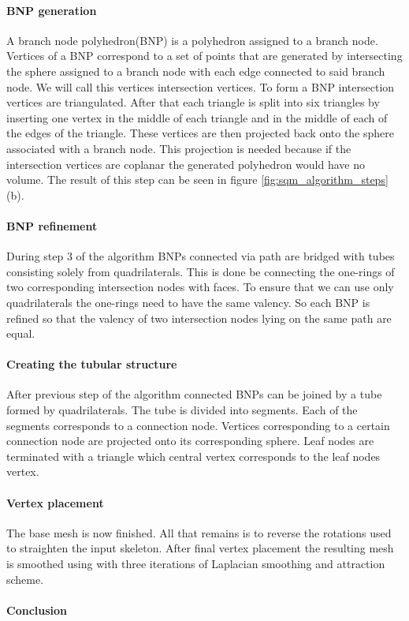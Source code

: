 \paragraph{BNP generation}
A branch node polyhedron(BNP) is a polyhedron assigned to a branch node. Vertices of a BNP correspond to a set of points that are generated by intersecting the sphere assigned to a branch node with each edge connected to said branch node. We will call this vertices intersection vertices. To form a BNP intersection vertices are triangulated. After that each triangle is split into six triangles by inserting one vertex in the middle of each triangle and in the middle of each of the edges of the triangle. These vertices are then projected back onto the sphere associated with a branch node. This projection is needed because if the intersection vertices are coplanar the generated polyhedron would have no volume. The result of this step can be seen in figure \ref{fig:sqm_algorithm_steps} (b).

\paragraph{BNP refinement}
During step 3 of the algorithm BNPs connected via path are bridged with tubes consisting solely from quadrilaterals. This is done be connecting the one-rings of two corresponding intersection nodes with faces. To ensure that we can use only quadrilaterals the one-rings need to have the same valency. So each BNP is refined so that the valency of two intersection nodes lying on the same path are equal.

\paragraph{Creating the tubular structure}
After previous step of the algorithm connected BNPs can be joined by a tube formed by quadrilaterals. The tube is divided into segments. Each of the segments corresponds to a connection node. Vertices corresponding to a certain connection node are projected onto its corresponding sphere. Leaf nodes are terminated with a triangle which central vertex corresponds to the leaf nodes vertex.

\paragraph{Vertex placement}
The base mesh is now finished. All that remains is to reverse the rotations used to straighten the input skeleton. After final vertex placement the resulting mesh is smoothed using with three iterations of Laplacian smoothing and attraction scheme.

\paragraph{Conclusion}